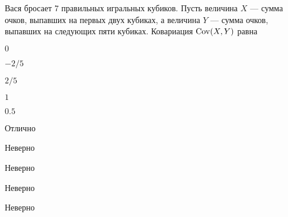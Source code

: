 
\begin{question}
Вася бросает 7 правильных игральных кубиков. Пусть величина \(X\) ---
сумма очков, выпавших на первых двух кубиках, а величина \(Y\) — сумма
очков, выпавших на следующих пяти кубиках. Ковариация \(\operatorname{Cov}(X,Y)\)
равна
\begin{answerlist}
  \item \(0\)
  \item \(-2/5\)
  \item \(2/5\)
  \item \(1\)
  \item \(0.5\)
\end{answerlist}
\end{question}

\begin{solution}
\begin{answerlist}
  \item Отлично
  \item Неверно
  \item Неверно
  \item Неверно
  \item Неверно
\end{answerlist}
\end{solution}

